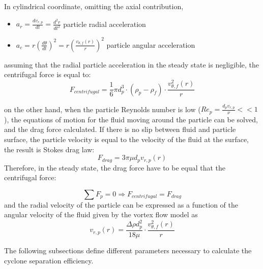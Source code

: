 In cylindrical coordinate, omitting the axial contribution, 
\begin{itemize}
	\item $a_r= \frac{d v_{r,p}}{d t}= \frac{d^2 r}{d t^2 }$ particle radial acceleration 
	
	\item $a_c= r \left( \frac{d \theta}{d t}\right)^2= r \left(\frac{v_{\theta,f} (r)}{r} \right)^2 $ particle angular acceleration
	
\end{itemize}
assuming that the radial particle acceleration in the steady state is negligible, the centrifugal force is equal to:
\begin{equation}
	F_{centrifugal}= \frac{1}{6} \pi d_p ^3 \cdot (\rho_p -\rho_f) \cdot \frac{v_{\theta,f} ^2(r)}{r}
\end{equation}

on the other hand, when the particle Reynolds number is low ($Re_p = \frac{d_p v_{r,p}}{\nu}<<1$), the
equations of motion for the fluid moving around the particle can be solved, and the drag force 
calculated. If there is no slip between fluid and particle surface, the particle velocity is
equal to the velocity of the fluid at the surface, the result is Stokes drag law: 
\begin{equation}
	F_{drag}=3 \pi  \mu d_p v_{r,p}(r) 
\end{equation}
Therefore, in the steady state, the drag force have to be equal that the centrifugal force:

\begin{equation}
	\sum F_p = 0 \Rightarrow F_{centrifugal}= F_{drag}  
\end{equation}
and the radial velocity of the particle can be expressed as a function of the angular velocity of the fluid given by the vortex flow model as
\begin{equation} \label{radial_velocity_particle}
	v_{r,p}(r)= \frac{\Delta \rho d_p ^2   }{18 \mu } \cdot \frac{v_{\theta,f}^2(r)}{r}
\end{equation}


The following subsections define different parameters necessary to calculate the cyclone separation efficiency.



